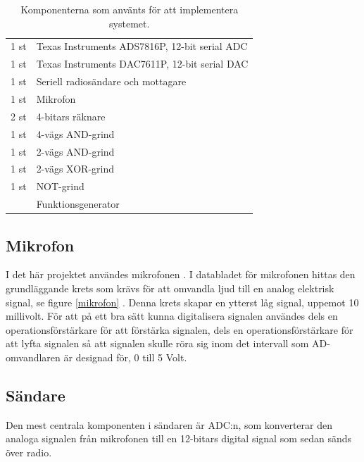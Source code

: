 \documentclass[a4paper,10pt]{article}
\begin{document}
\begin{table}
    \centering
    \begin{tabular}{|l|l|}
    \hline
    1 st & Texas Instruments ADS7816P, 12-bit serial ADC \\
    1 st & Texas Instruments DAC7611P, 12-bit serial DAC \\
    1 st & Seriell radiosändare och mottagare \\
    1 st & Mikrofon \\
    2 st & 4-bitars räknare \\
    1 st & 4-vägs AND-grind\\
    1 st & 2-vägs AND-grind \\
    1 st & 2-vägs XOR-grind \\
    1 st & NOT-grind \\
	 & Funktionsgenerator \\
    \hline
    \end{tabular}
    
    \caption{Komponenterna som använts för att implementera systemet.}
    \label{tab:komponenter}

\end{table}

\subsection{Mikrofon}
I det här projektet användes mikrofonen . I databladet för mikrofonen 
hittas den grundläggande krets som krävs för att omvandla ljud till en analog 
elektrisk signal, se figure \ref{mikrofon} 
. 
Denna krets skapar en ytterst låg signal, uppemot 10 millivolt. För att på ett 
bra sätt kunna digitalisera signalen användes dels en operationsförstärkare för 
att förstärka signalen, dels en operationsförstärkare för att lyfta signalen så 
att signalen skulle röra sig inom det intervall som AD-omvandlaren är designad 
för, 0 till 5 Volt.



\subsection{Sändare}

Den mest centrala komponenten i sändaren är ADC:n, som konverterar den analoga
signalen från mikrofonen till en 12-bitars digital signal som sedan sänds över
radio.
\end{document}
